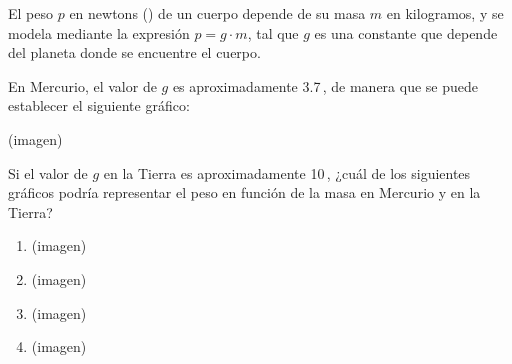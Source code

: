 \begin{problem}
    El peso $p$ en newtons () de un cuerpo depende de su masa $m$ en kilogramos, y se modela mediante la expresión $p = g \cdot m$, tal que $g$ es una constante que depende del planeta donde se encuentre el cuerpo.

    En Mercurio, el valor de $g$ es aproximadamente 3.7\,, de manera que se puede establecer el siguiente gráfico:

    \begin{center}
    (imagen)
    \end{center}

    Si el valor de $g$ en la Tierra es aproximadamente 10\,, ¿cuál de los siguientes gráficos podría representar el peso en función de la masa en Mercurio y en la Tierra?

    \begin{enumerate}[label=\Alph*.]
        \item (imagen)
        \item (imagen)
        \item (imagen)
        \item (imagen)
    \end{enumerate}
\end{problem}
